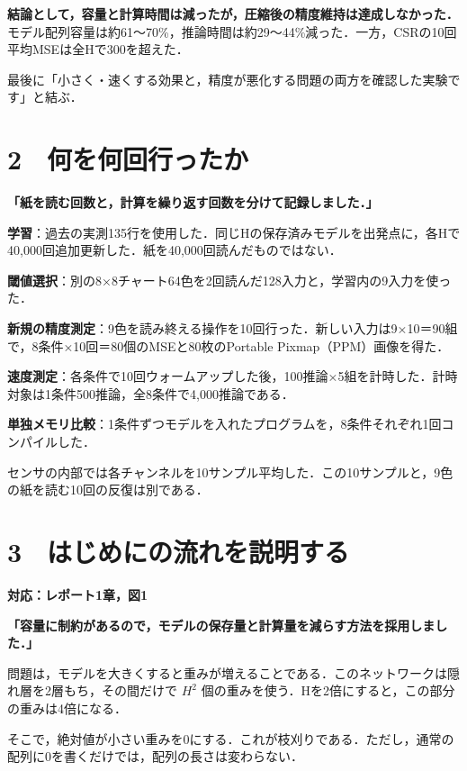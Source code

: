 \documentclass[
  14pt,
  a5paper,
]{extarticle}
\begin{document}
\textbf{結論として，容量と計算時間は減ったが，圧縮後の精度維持は達成しなかった．}
モデル配列容量は約61〜70\%，推論時間は約29〜44\%減った．一方，CSRの10回平均MSEは全Hで300を超えた．

最後に「小さく・速くする効果と，精度が悪化する問題の両方を確認した実験です」と結ぶ．

\newpage

\section{2　何を何回行ったか}\label{ux4f55ux3092ux4f55ux56deux884cux3063ux305fux304b}

\textbf{「紙を読む回数と，計算を繰り返す回数を分けて記録しました．」}

\textbf{学習}：過去の実測135行を使用した．同じHの保存済みモデルを出発点に，各Hで40,000回追加更新した．紙を40,000回読んだものではない．

\textbf{閾値選択}：別の8×8チャート64色を2回読んだ128入力と，学習内の9入力を使った．

\textbf{新規の精度測定}：9色を読み終える操作を10回行った．新しい入力は9×10＝90組で，8条件×10回＝80個のMSEと80枚のPortable
Pixmap（PPM）画像を得た．

\textbf{速度測定}：各条件で10回ウォームアップした後，100推論×5組を計時した．計時対象は1条件500推論，全8条件で4,000推論である．

\textbf{単独メモリ比較}：1条件ずつモデルを入れたプログラムを，8条件それぞれ1回コンパイルした．

センサの内部では各チャンネルを10サンプル平均した．この10サンプルと，9色の紙を読む10回の反復は別である．

\newpage

\section{3　はじめにの流れを説明する}\label{ux306fux3058ux3081ux306bux306eux6d41ux308cux3092ux8aacux660eux3059ux308b}

\textbf{対応：レポート1章，図1}

\textbf{「容量に制約があるので，モデルの保存量と計算量を減らす方法を採用しました．」}

問題は，モデルを大きくすると重みが増えることである．このネットワークは隠れ層を2層もち，その間だけで
\(H^2\) 個の重みを使う．Hを2倍にすると，この部分の重みは4倍になる．

そこで，絶対値が小さい重みを0にする．これが枝刈りである．ただし，通常の配列に0を書くだけでは，配列の長さは変わらない．
\end{document}
